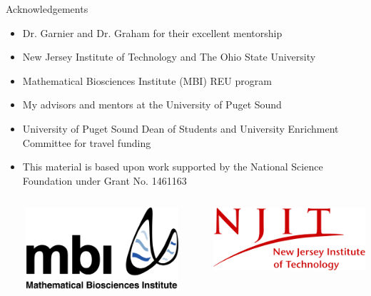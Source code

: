 \begin{frame}{Acknowledgements}
\begin{itemize}
\item Dr. Garnier and Dr. Graham for their excellent mentorship
\item New Jersey Institute of Technology and The Ohio State University
\item Mathematical Biosciences Institute (MBI) REU program
\item My advisors and mentors at the University of Puget Sound
\item University of Puget Sound Dean of Students and University Enrichment Committee for travel funding
\item This material is based upon work supported by the National Science Foundation under Grant No. 1461163
\end{itemize}
\begin{columns}[T,onlytextwidth]
\column{\textwidth}
\begin{minipage}[]{0.0125\textwidth}
~
\end{minipage}%
\begin{minipage}[]{0.225\textwidth}
    \includegraphics[width=\textwidth]{images/mbiwtext}
\end{minipage}%
\begin{minipage}[]{0.025\textwidth}
~
\end{minipage}%
\begin{minipage}[]{0.225\textwidth}
    \includegraphics[width = \textwidth]{images/Logo_of_New_Jersey_Institute_of_Technology}

\end{minipage}
\end{columns}
\end{frame}
